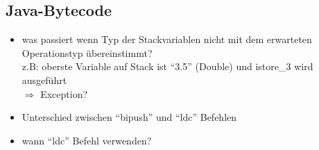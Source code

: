 \subsection{Java-Bytecode}
\begin{itemize}
	\item was passiert wenn Typ der Stackvariablen nicht mit dem erwarteten Operationstyp übereinstimmt?\\
		z.B: oberste Variable auf Stack ist \enquote{3.5} (Double) und istore\_3 wird ausgeführt\\
		$\Rightarrow$ Exception?
	\item Unterschied zwischen \enquote{bipush} und \enquote{ldc} Befehlen
	\item wann \enquote{ldc} Befehl verwenden? 
\end{itemize} 